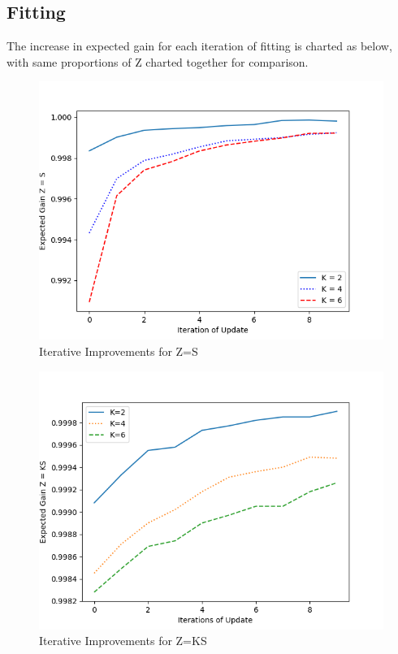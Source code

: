 \documentclass[10pt, conference]{IEEEtran}
\begin{document}
\subsection{Fitting}
The increase in expected gain for each iteration of fitting is charted as below, with same proportions of Z charted together for comparison. 
\begin{figure}[htbp]
\centerline{\includegraphics[scale=0.5]{Z_S.png}}
\caption{Iterative Improvements for Z=S}
\label{fig}
\end{figure}
\begin{figure}[htbp]
\centerline{\includegraphics[scale=0.5]{Z_KS.png}}
\caption{Iterative Improvements for Z=KS}
\label{fig}
\end{figure}
\end{document}
